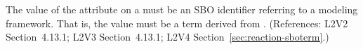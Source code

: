 The value of the  attribute on a \Reaction must be an SBO
identifier referring to a modeling framework.  That is, the value must
be a term derived from \sboevent.  (References: L2V2 Section~4.13.1; L2V3
Section~4.13.1; L2V4 Section~\ref{sec:reaction-sboterm}.)
